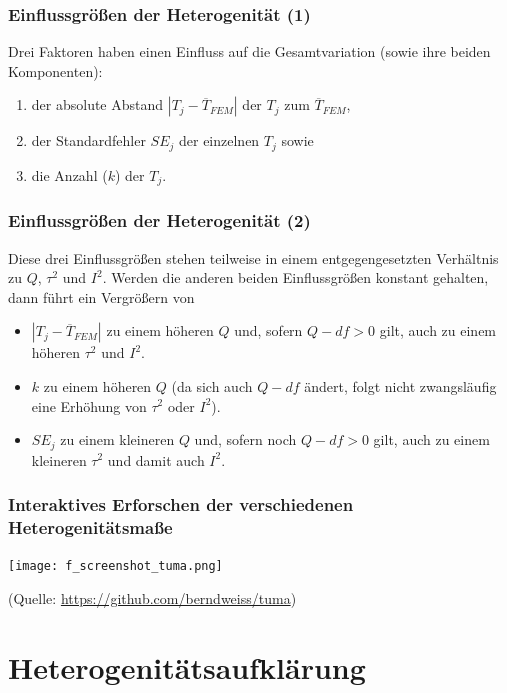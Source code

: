 \begin{frame}
  \frametitle{Einflussgrößen der Heterogenität (1)}
  Drei Faktoren haben einen Einfluss auf die Gesamtvariation (sowie ihre beiden Komponenten):
  \begin{enumerate}
  \item der absolute Abstand $|T_j - \overline{T}_{FEM}|$ der $T_j$ zum $\overline{T}_{FEM}$,
  \item der Standardfehler $SE_j$ der einzelnen $T_j$ sowie
  \item die Anzahl ($k$) der $T_j$.
  \end{enumerate}
\end{frame}


\begin{frame}
  \frametitle{Einflussgrößen der Heterogenität (2)}
  Diese drei Einflussgrößen stehen teilweise in einem entgegengesetzten Verhältnis zu $Q$, $\tau^2$ und
    $I^2$. Werden die anderen beiden Einflussgrößen konstant gehalten, dann führt ein Vergrößern von
    \begin{itemize}
    \item $|T_j - \overline{T}_{FEM}|$ zu einem höheren $Q$ und, sofern $Q-df > 0$ gilt, auch zu einem höheren $\tau^2$
      und $I^2$.
    \item $k$ zu einem höheren $Q$ (da sich auch $Q-df$ ändert, folgt nicht zwangsläufig eine Erhöhung von $\tau^2$
      oder $I^2$).
    \item $SE_j$ zu einem kleineren $Q$ und, sofern noch $Q-df > 0$ gilt, auch zu einem kleineren $\tau^2$ und damit
      auch $I^2$.
    \end{itemize}
 \end{frame}


 \begin{frame}[plain]\frametitle{Interaktives Erforschen der verschiedenen Heterogenitätsmaße}
   \begin{center}
     \texttt{[image: f\_screenshot\_tuma.png]}
   \end{center}
   (Quelle: \url{https://github.com/berndweiss/tuma})
 \end{frame}


\section{Heterogenitätsaufklärung}


